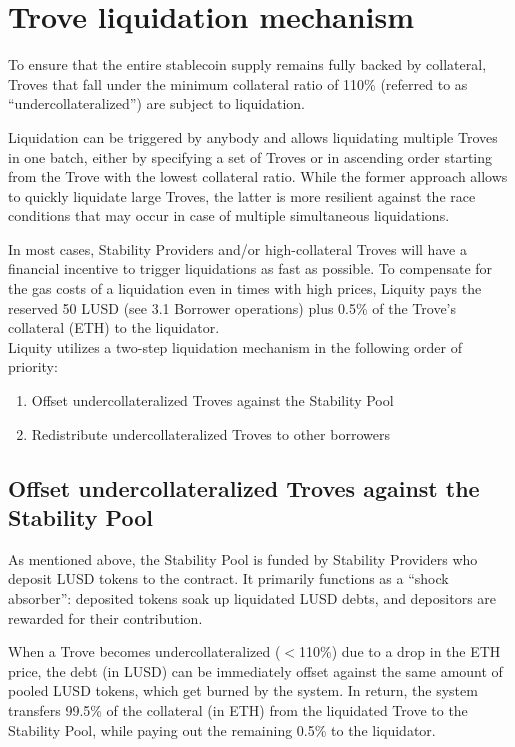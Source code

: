 \documentclass{article}
\begin{document}
\section{Trove liquidation mechanism}
To ensure that the entire stablecoin supply remains fully backed by collateral, Troves that fall under the minimum collateral ratio of 110\% (referred to as “undercollateralized”) are subject to liquidation.

Liquidation can be triggered by anybody and allows liquidating multiple Troves in one batch, either by specifying a set of Troves or in ascending order starting from the Trove with the lowest collateral ratio. While the former approach allows to quickly liquidate large Troves, the latter is more resilient against the race conditions that may occur in case of multiple simultaneous liquidations.

In most cases, Stability Providers and/or high-collateral Troves will have a financial incentive to trigger liquidations as fast as possible. To compensate for the gas costs of a liquidation even in times with high prices, Liquity pays the reserved 50 LUSD (see 3.1 Borrower operations) plus 0.5\% of the Trove’s collateral (ETH) to the liquidator.
\\

Liquity utilizes a two-step liquidation mechanism in the following order of priority:
\begin{enumerate}
    \item Offset undercollateralized Troves against the Stability Pool
    \item Redistribute undercollateralized Troves to other borrowers
\end{enumerate}

\subsection{Offset undercollateralized Troves against the Stability Pool}
As mentioned above, the Stability Pool is funded by Stability Providers who deposit LUSD tokens to the contract. It primarily functions as a “shock absorber”: deposited tokens soak up liquidated LUSD debts, and depositors are rewarded for their contribution. 

When a Trove becomes undercollateralized ($<$110\%) due to a drop in the ETH price, the debt (in LUSD) can be immediately offset against the same amount of pooled LUSD tokens, which get burned by the system. In return, the system transfers 99.5\% of the collateral (in ETH) from the liquidated Trove to the Stability Pool, while paying out the remaining 0.5\% to the liquidator.\\
\end{document}
